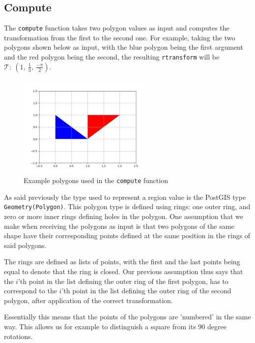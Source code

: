 \subsection{Compute}
\label{section:compute}

The \lstinline{compute} function takes two polygon values as input and computes the transformation from the first to the second one. For example, taking the two polygons shown below as input, with the blue polygon being the first argument and the red polygon being the second, the resulting \lstinline{rtransform} will be $\mathcal{T}:\ (1,\ \frac{1}{3},\ \frac{-\pi}{2})$.

\begin{figure}[h!]
    \centering
    \includegraphics[width=0.6\textwidth]{images/example_simple_transformation.png}
    \caption{Example polygons used in the \lstinline{compute} function}
    \label{fig:example_compute}
\end{figure}


As said previously the type used to represent a region value is the PostGIS type \lstinline{Geometry(Polygon)}. This polygon type is defined using rings: one outer ring, and zero or more inner rings defining holes in the polygon. One assumption that we make when receiving the polygons as input is that two polygons of the same shape have their corresponding points defined at the same position in the rings of said polygons. 

The rings are defined as lists of points, with the first and the last points being equal to denote that the ring is closed. Our previous assumption thus says that the $i$'th point in the list defining the outer ring of the first polygon, has to correspond to the $i$'th point in the list defining the outer ring of the second polygon, after application of the correct transformation.

Essentially this means that the points of the polygons are 'numbered' in the same way. This allows us for example to distinguish a square from its 90 degree rotations. \\

